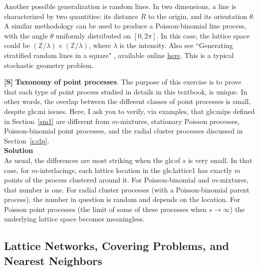 \documentclass[10pt]{article}
\begin{document}
\begin{Exercise}
Another possible generalization is \textcolor{index}{random lines}. In two dimensions, a line is characterized by two quantities:
its distance $R$ to the origin, and its orientation $\theta$. A similar methodology can be used to produce a Poisson-binomial line process, with the angle $\theta$ uniformly distributed on
$[0, 2\pi]$.  In this case, the lattice space could be $(\mathbb{Z}/\lambda) \times (\mathbb{Z}/\lambda)$, where $\lambda$ is the intensity. Also see ``Generating stratified random lines in a square" \cite{line12}, available online \href{https://jcgt.org/published/0006/02/03/}{here}.
This is a typical \textcolor{index}{stochastic geometry} problem.

\end{Exercise}

\begin{Exercise}\label{exercisec1}
{\bf [S]}  {\bf Taxonomy of point processes}. The purpose of this exercise is to prove that each type of point process studied in details in this textbook, is unique. In other words, the overlap between the different classes of point processes is small, despite \gls{gls:mi} issues. Here, I ask you to verify, via examples, that \glspl{gls:mip} defined in Section~\ref{sm1} are different from \textcolor{index}{$m$-mixtures}, stationary Poisson processes, Poisson-binomial point processes, and the radial cluster processes discussed in Section~\ref{s:clp}.
\vspace{1ex} \\
{\bf Solution} \vspace{1ex} \\
As usual, the differences are most striking when the \gls{gls:sf} $s$ is very small. In that case, for $m$-interlacings, each lattice
location in the \gls{gls:lattice1} has exactly $m$ points of the process clustered around it. For Poisson-binomial and $m$-mixtures,
that number is one. For radial cluster processes (with a Poisson-binomial parent process), the number in question is random and depends on the location.
For Poisson point processes (the limit of some of these processes when $s\rightarrow\infty$) the underlying lattice space becomes meaningless.
\end{Exercise}

\subsection{Lattice Networks, Covering Problems, and Nearest Neighbors}\label{lattnn}
\end{document}
